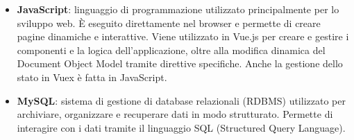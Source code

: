 \begin{itemize}
    \item \textbf{JavaScript}: linguaggio di programmazione utilizzato principalmente per lo sviluppo web. È eseguito direttamente nel browser e permette di creare
    pagine dinamiche e interattive. Viene utilizzato in Vue.js per creare e gestire i componenti e la logica dell'applicazione, oltre alla modifica dinamica del
    Document Object Model tramite direttive specifiche. Anche la gestione dello stato in Vuex è fatta in JavaScript.
    \item \textbf{MySQL}: sistema di gestione di database relazionali (RDBMS) utilizzato per archiviare, organizzare e recuperare dati in modo strutturato. Permette
    di interagire con i dati tramite il linguaggio SQL (Structured Query Language).
\end{itemize}